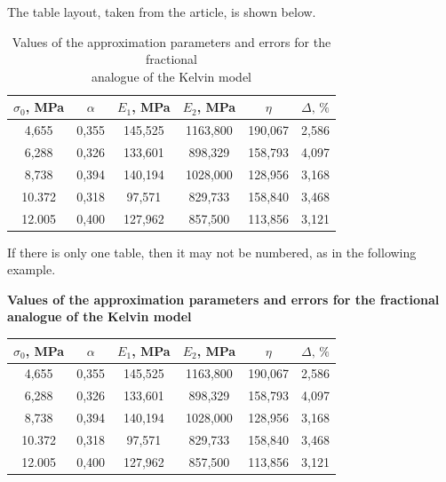\documentclass{mfitjournal-en}%
\begin{document}
The table layout, taken from the \cite{Ung16} article, is shown below. 

\begin{table}[h!]
\centering
\caption{Values of the approximation parameters and errors for the fractional \\ analogue of the Kelvin model \label{un:tabl1}}
	\renewcommand{\tabcolsep}{0.67cm}
	\begin{tabular}{c|c|c|c|c|c}
		\hline
		\rule{0mm}{11pt}%
		\footnotesize $\sigma_{0}$, MPa & \footnotesize  $\alpha$ & \footnotesize  $E_{1}$, MPa & \footnotesize  $E_{2}$, MPa & \footnotesize  $\eta$ & \footnotesize  $\Delta,\, \%$ \\
		\hline
		\rule{0mm}{12pt}%
		\phantom{1}4,655 & 0,355 & 145,525 & 1163,800 & 190,067 & 2,586 \\
		\phantom{1}6,288 & 0,326 & 133,601 & \phantom{1}898,329 & 158,793 & 4,097 \\
		\phantom{1}8,738 & 0,394 & 140,194 & 1028,000 & 128,956 & 3,168 \\
		10.372 & 0,318 & \phantom{1}97,571 & \phantom{1}829,733 & 158,840 & 3,468 \\
		12.005 & 0,400 & 127,962 & \phantom{1}857,500 & 113,856 & 3,121 \\
		\hline
	\end{tabular}
	
\end{table} 

If there is only one table, then it may not be numbered, as in the following example.
\newpage
\vspace*{0.5em}
\hspace{34em}{\it Table}
\vspace{-1em}
\begin{center}
\textbf{Values of the approximation parameters and errors for the fractional \\ analogue of the Kelvin model}
\end{center}
\label{un:tabl2}
\vspace{-1em}
\begin{table}[h!]
	\centering
	\renewcommand{\tabcolsep}{0.67cm}
	\begin{tabular}{c|c|c|c|c|c}
		\hline
		\rule{0mm}{11pt}%
		\footnotesize $\sigma_{0}$, MPa & \footnotesize  $\alpha$ & \footnotesize  $E_{1}$, MPa & \footnotesize  $E_{2}$, MPa & \footnotesize  $\eta$ & \footnotesize  $\Delta,\, \%$ \\
		\hline
		\rule{0mm}{12pt}%
		\phantom{1}4,655 & 0,355 & 145,525 & 1163,800 & 190,067 & 2,586 \\
		\phantom{1}6,288 & 0,326 & 133,601 & \phantom{1}898,329 & 158,793 & 4,097 \\
		\phantom{1}8,738 & 0,394 & 140,194 & 1028,000 & 128,956 & 3,168 \\
		10.372 & 0,318 & \phantom{1}97,571 & \phantom{1}829,733 & 158,840 & 3,468 \\
		12.005 & 0,400 & 127,962 & \phantom{1}857,500 & 113,856 & 3,121 \\
		\hline
	\end{tabular}
	
\end{table} 
\end{document}
